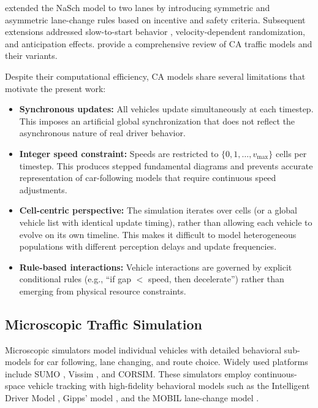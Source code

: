 \documentclass[review,authoryear]{elsarticle}
\begin{document}
\citet{rickert1996two} extended the NaSch model to two lanes by introducing symmetric and asymmetric lane-change rules based on incentive and safety criteria. Subsequent extensions addressed slow-to-start behavior \citep{knospe2004towards}, velocity-dependent randomization, and anticipation effects. \citet{maerivoet2005cellular} provide a comprehensive review of CA traffic models and their variants.

Despite their computational efficiency, CA models share several limitations that motivate the present work:

\begin{itemize}
    \item \textbf{Synchronous updates:} All vehicles update simultaneously at each timestep. This imposes an artificial global synchronization that does not reflect the asynchronous nature of real driver behavior.

    \item \textbf{Integer speed constraint:} Speeds are restricted to $\{0, 1, \ldots, v_{\max}\}$ cells per timestep. This produces stepped fundamental diagrams and prevents accurate representation of car-following models that require continuous speed adjustments.

    \item \textbf{Cell-centric perspective:} The simulation iterates over cells (or a global vehicle list with identical update timing), rather than allowing each vehicle to evolve on its own timeline. This makes it difficult to model heterogeneous populations with different perception delays and update frequencies.

    \item \textbf{Rule-based interactions:} Vehicle interactions are governed by explicit conditional rules (e.g., ``if gap $<$ speed, then decelerate'') rather than emerging from physical resource constraints.
\end{itemize}

\subsection{Microscopic Traffic Simulation}
\label{sec:lit_microsim}

Microscopic simulators model individual vehicles with detailed behavioral sub-models for car following, lane changing, and route choice. Widely used platforms include SUMO \citep{lopez2018microscopic}, Vissim \citep{fellendorf2010microscopic}, and CORSIM. These simulators employ continuous-space vehicle tracking with high-fidelity behavioral models such as the Intelligent Driver Model \citep[IDM;][]{treiber2000congested}, Gipps' model \citep{gipps1981behavioural}, and the MOBIL lane-change model \citep{kesting2007general}.
\end{document}
